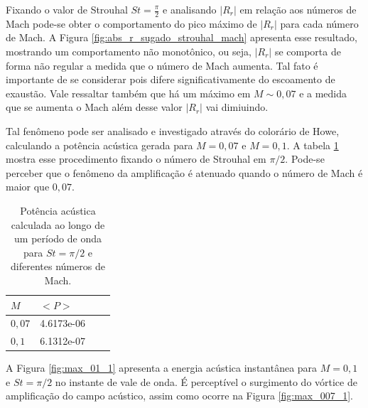 \newpage
\begin{figure}[ht!]
\centering
  
\end{figure}

Fixando o valor de Strouhal $St = \frac{\pi}{2}$ e analisando $|R_{r}|$ em relação aos números de Mach pode-se obter o comportamento do pico máximo de $|R_{r}|$ para cada número de Mach. A Figura \ref{fig:abs_r_sugado_strouhal_mach} apresenta esse resultado, mostrando um comportamento não monotônico, ou seja, $|R_{r}|$ se comporta de forma não regular a medida que o número de Mach aumenta. Tal fato é importante de se considerar pois difere significativamente do escoamento de exaustão. Vale ressaltar também que há um máximo em $M \sim 0,07$ e a medida que se aumenta o Mach além desse valor $|R_{r}|$ vai dimiuindo.

Tal fenômeno pode ser analisado e investigado através do colorário de Howe, calculando a potência acústica gerada para $M = 0,07$ e $M = 0,1$. A tabela \ref{table:potencia_mach} mostra esse procedimento fixando o número de Strouhal em $\pi/2$. Pode-se perceber que o fenômeno da amplificação é atenuado quando o número de Mach é maior que $0,07$.    

\begin{table}[ht!]
\centering
\caption{Potência acústica calculada ao longo de um período de onda para $St = \pi/2$ e diferentes números de Mach.}
\label{table:potencia_mach}
    \begin{tabular}{|l|l|l|l|}
        \hline
        $M$ & $<P>$ \\ \hline
        $0,07$ & 4.6173e-06  \\ \hline  
        $0,1$ & 6.1312e-07 \\ \hline
    \end{tabular}
\end{table}

A Figura \ref{fig:max_01_1} apresenta a energia acústica instantânea para $M = 0,1$ e $St = \pi/2$ no instante de vale de onda. É perceptível o surgimento do vórtice de amplificação do campo acústico, assim como ocorre na Figura \ref{fig:max_007_1}.

